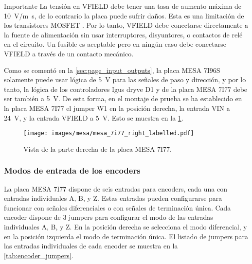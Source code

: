 \documentclass[english,spanish,a4paper,11pt]{article}
\begin{document}
\begin{admonition}{Importante}
    La tensión en VFIELD debe tener una tasa de aumento máxima de \qty{10}{\V/\m\s}, de lo contrario la placa puede sufrir daños. Esta es una limitación de los transistores MOSFET \cite{toshiba2018impacts, toshiba2018mosfets, nexperia2023power, bai2003analysis}. Por lo tanto, VFIELD debe conectarse directamente a la fuente de alimentación sin usar interruptores, disyuntores, o contactos de relé en el circuito. Un fusible es aceptable pero en ningún caso debe conectarse VFIELD a través de un contacto mecánico.
\end{admonition}

Como se comentó en la \cref{sec:page_input_outputs}, la placa MESA 7I96S solamente puede usar lógica de \qty{5}{\V} para las señales de paso y dirección, y por lo tanto, la lógica de los controladores Igus dryve D1 y de la placa MESA 7I77 debe ser también a \qty{5}{\V}. De esta forma, en el montaje de prueba se ha establecido en la placa MESA 7I77 el jumper W1 en la posición derecha, la entrada VIN a \qty{24}{\V}, y la entrada VFIELD a \qty{5}{\V}. Esto se muestra en la \cref{fig:mesa7i77_right}.


\begin{figure}[!ht]
    \centering
    \texttt{[image: images/mesa/mesa\_7i77\_right\_labelled.pdf]}
    \caption{Vista de la parte derecha de la placa MESA 7I77.}
    \label{fig:mesa7i77_right}
\end{figure}


\subsubsection{Modos de entrada de los encoders}

La placa MESA 7I77 dispone de seis entradas para encoders, cada una con entradas individuales A, B, y Z. Estas entradas pueden configurarse para funcionar con señales diferenciales o con señales de terminación única. Cada encoder dispone de 3 jumpers para configurar el modo de las entradas individuales A, B, y Z. En la posición derecha se selecciona el modo diferencial, y en la posición izquierda el modo de terminación única. El listado de jumpers para las entradas individuales de cada encoder se muestra en la \cref{tab:encoder_jumpers}.
\end{document}
